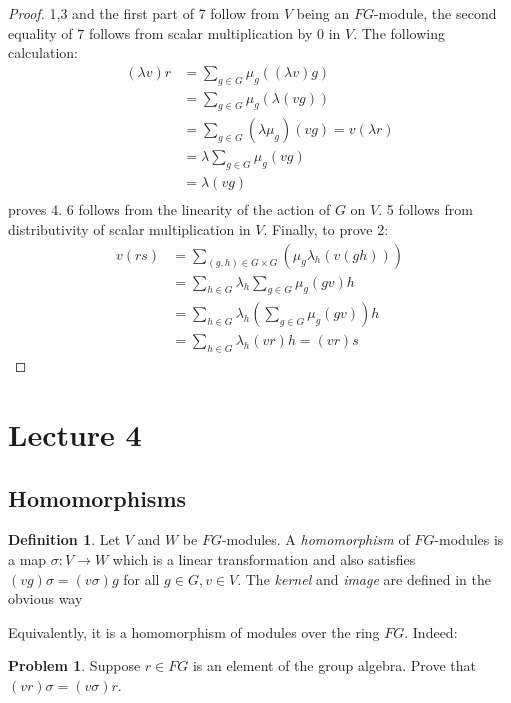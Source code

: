 \documentclass[11pt, notitlepage]{article}
\numberwithin{equation}{section}
\theoremstyle{plain}
\theoremstyle{definition}
\newtheorem{definition}[theorem]{Definition}
\newtheorem{problem}{Problem}
\begin{document}
\begin{proof}
	1,3 and the first part of 7 follow from $V$ being an $FG$-module, the second equality of $7$ follows from scalar multiplication by 0 in $V$. The following calculation:
	\begin{align*}
	(\lambda v)r &= \sum_{g\in G}\mu_g((\lambda v)g)\\
	&=\sum_{g\in G}\mu_g(\lambda (vg))\\
	&=\sum_{g\in G}(\lambda \mu_g)(vg)=v(\lambda r)\\
	&=\lambda\sum_{g\in G}\mu_g (vg)\\
	&=\lambda(vg)\\
	\end{align*}proves 4. 6 follows from the linearity of the action of $G$ on $V$. 5 follows from distributivity of scalar multiplication in $V$. Finally, to prove 2:
	\begin{align*}
	v(rs)&=\sum_{(g,h)\in G\times G}(\mu_g\lambda_h(v(gh)))\\
	&= \sum_{h\in G}\lambda_h\sum_{g\in G}\mu_g(gv)h\\
	&= \sum_{h\in G}\lambda_h\left(\sum_{g\in G}\mu_g(gv)\right)h\\
	&=\sum_{h\in G}\lambda_h(vr)h=(vr)s
	\end{align*}
\end{proof}

\section{Lecture 4}

\subsection{Homomorphisms} 

\begin{definition}
	Let $V$ and $W$ be $FG$-modules. A \textit{homomorphism} of $FG$-modules is a map $\sigma: V \rightarrow W$ which is a linear transformation and also satisfies $(vg)\sigma = (v\sigma)g$ for all $g\in G, v\in V$. The \textit{kernel} and \textit{image} are defined in the obvious way
\end{definition}
Equivalently, it is a homomorphism of modules over the ring $FG$. Indeed:
\begin{problem}
	Suppose $r\in FG$ is an element of the group algebra. Prove that $(vr)\sigma = (v\sigma)r$.
\end{problem}
\end{document}
